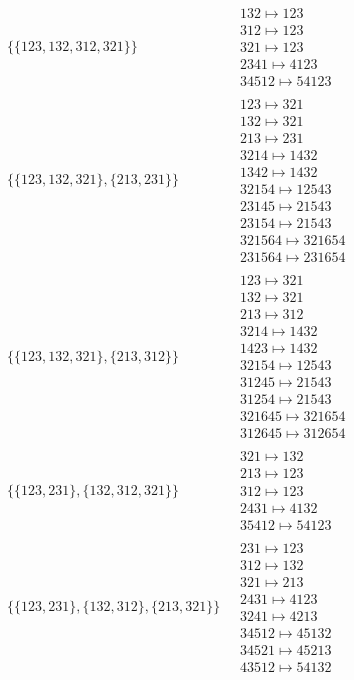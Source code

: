 \begin{scriptsize}
\begin{align}
\begin{matrix}
\end{matrix}
\\
\{\{123, 132, 312, 321\}\}
\ 
&
\begin{matrix}
132 \mapsto 123\\312 \mapsto 123\\321 \mapsto 123\\2341 \mapsto 4123\\34512 \mapsto 54123
\end{matrix}
\\
\{\{123, 132, 321\}, \{213, 231\}\}
\ 
&
\begin{matrix}
123 \mapsto 321\\132 \mapsto 321\\213 \mapsto 231\\3214 \mapsto 1432\\1342 \mapsto 1432\\32154 \mapsto 12543\\23145 \mapsto 21543\\23154 \mapsto 21543\\321564 \mapsto 321654\\231564 \mapsto 231654
\end{matrix}
\\
\{\{123, 132, 321\}, \{213, 312\}\}
\ 
&
\begin{matrix}
123 \mapsto 321\\132 \mapsto 321\\213 \mapsto 312\\3214 \mapsto 1432\\1423 \mapsto 1432\\32154 \mapsto 12543\\31245 \mapsto 21543\\31254 \mapsto 21543\\321645 \mapsto 321654\\312645 \mapsto 312654
\end{matrix}
\\
\{\{123, 231\}, \{132, 312, 321\}\}
\ 
&
\begin{matrix}
321 \mapsto 132\\213 \mapsto 123\\312 \mapsto 123\\2431 \mapsto 4132\\35412 \mapsto 54123
\end{matrix}
\\
\{\{123, 231\}, \{132, 312\}, \{213, 321\}\}
\ 
&
\begin{matrix}
231 \mapsto 123\\312 \mapsto 132\\321 \mapsto 213\\2431 \mapsto 4123\\3241 \mapsto 4213\\34512 \mapsto 45132\\34521 \mapsto 45213\\43512 \mapsto 54132

\end{matrix}
\end{align}
\end{scriptsize}
